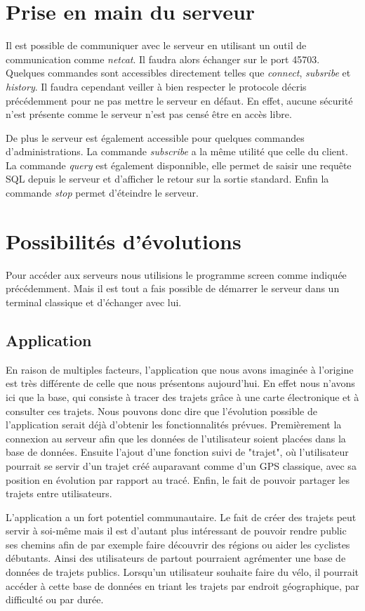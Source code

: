 \vspace{5cm}
\section{Prise en main du serveur}
Il est possible de communiquer avec le serveur en utilisant un outil de communication comme \emph{netcat}. Il faudra alors échanger sur le port 45703. Quelques commandes sont accessibles directement telles que \emph{connect}, \emph{subsribe} et \emph{history}. Il faudra cependant veiller à bien respecter le protocole décris précédemment pour ne pas mettre le serveur en défaut. En effet, aucune sécurité n'est présente comme le serveur n'est pas censé être en accès libre.
\par
De plus le serveur est également accessible pour quelques commandes d'administrations. La commande \emph{subscribe} a la même utilité que celle du client.
La commande \emph{query} est également disponnible, elle permet de saisir une requête SQL depuis le serveur et d'afficher le retour sur la sortie standard. Enfin la commande \emph{stop} permet d'éteindre le serveur.
\section{Possibilités d'évolutions}
\par
Pour accéder aux serveurs nous utilisions le programme screen comme indiquée précédemment. Mais il est tout a fais possible de démarrer le serveur dans un terminal classique et d'échanger avec lui.
\subsection{Application}
En raison de multiples facteurs, l'application que nous avons imaginée à l'origine est très différente de celle que nous présentons aujourd'hui.
En effet nous n'avons ici que la base, qui consiste à tracer des trajets grâce à une carte électronique et à consulter ces trajets. Nous pouvons
donc dire que l'évolution possible de l'application serait déjà d'obtenir les fonctionnalités prévues. Premièrement la connexion au serveur
afin que les données de l'utilisateur soient placées dans la base de données. Ensuite l'ajout d'une fonction suivi de "trajet", où l'utilisateur
pourrait se servir d'un trajet créé auparavant comme d'un GPS classique, avec sa position en évolution par rapport au tracé. Enfin, le fait
de pouvoir partager les trajets entre utilisateurs.

L'application a un fort potentiel communautaire. Le fait de créer des trajets peut servir à soi-même mais il est d'autant plus intéressant
de pouvoir rendre public ses chemins afin de par exemple faire découvrir des régions ou aider les cyclistes débutants. Ainsi des utilisateurs
de partout pourraient agrémenter une base de données de trajets publics. Lorsqu'un utilisateur souhaite faire du vélo, il pourrait accéder
à cette base de données en triant les trajets par endroit géographique, par difficulté ou par durée.

